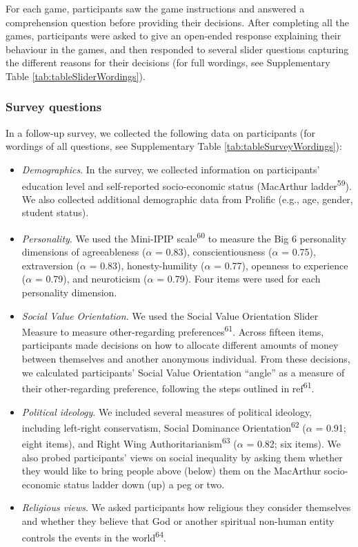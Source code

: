 \documentclass[
  man,floatsintext]{apa6}
\providecommand{\tightlist}{%
  \setlength{\itemsep}{0pt}\setlength{\parskip}{0pt}}
\begin{document}
For each game, participants saw the game instructions and answered a
comprehension question before providing their decisions. After completing all
the games, participants were asked to give an open-ended response explaining
their behaviour in the games, and then responded to several slider questions
capturing the different reasons for their decisions (for full wordings, see
Supplementary Table \ref{tab:tableSliderWordings}).

\hypertarget{survey-questions}{%
\subsubsection{Survey questions}\label{survey-questions}}

In a follow-up survey, we collected the following data on participants (for
wordings of all questions, see Supplementary Table
\ref{tab:tableSurveyWordings}):

\begin{itemize}
\tightlist
\item
  \emph{Demographics}. In the survey, we collected information on participants'
  education level and self-reported socio-economic status (MacArthur ladder\textsuperscript{59}). We also collected additional demographic data from Prolific
  (e.g., age, gender, student status).
\item
  \emph{Personality}. We used the Mini-IPIP scale\textsuperscript{60} to measure the Big 6
  personality dimensions of agreeableness (\(\alpha\) =
  0.83), conscientiousness (\(\alpha\) =
  0.75), extraversion (\(\alpha\) =
  0.83), honesty-humility (\(\alpha\) =
  0.77), openness to experience (\(\alpha\) =
  0.79), and neuroticism (\(\alpha\) =
  0.79). Four items were used for each
  personality dimension.
\item
  \emph{Social Value Orientation}. We used the Social Value Orientation Slider
  Measure to measure other-regarding preferences\textsuperscript{61}. Across fifteen
  items, participants made decisions on how to allocate different amounts of
  money between themselves and another anonymous individual. From these
  decisions, we calculated participants' Social Value Orientation ``angle'' as a
  measure of their other-regarding preference, following the steps outlined in
  ref\textsuperscript{61}.
\item
  \emph{Political ideology}. We included several measures of political ideology,
  including left-right conservatism, Social Dominance Orientation\textsuperscript{62}
  (\(\alpha\) = 0.91; eight items), and Right
  Wing Authoritarianism\textsuperscript{63} (\(\alpha\) =
  0.82; six items). We also probed
  participants' views on social inequality by asking them whether they would
  like to bring people above (below) them on the MacArthur socio-economic status
  ladder down (up) a peg or two.
\item
  \emph{Religious views}. We asked participants how religious they consider
  themselves and whether they believe that God or another spiritual non-human
  entity controls the events in the world\textsuperscript{64}.
\end{itemize}
\end{document}
